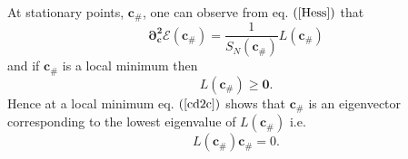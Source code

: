 \documentclass[aps,preprint]{revtex4}%
\begin{document}
At stationary points, $\mathbf{c}_{\#}$, one can observe from eq. $\left(
\ref{Hess}\right)  $ that
\begin{equation}
\mathbf{\partial_{\mathbf{c}}^{2}\mathcal{E}\left(  \mathbf{c}_{\#}\right)
=}\frac{1}{S_{N}\left(  \mathbf{c}_{\#}\right)  }L\left(  \mathbf{c}%
_{\#}\right)
\end{equation}
and if $\mathbf{c}_{\#}$ is a local minimum then
\begin{equation}
L\left(  \mathbf{c}_{\#}\right)  \geq\mathbf{0.}%
\end{equation}
Hence at a local minimum eq. $\left(  \ref{cd2c}\right)  $ shows that
$\mathbf{c}_{\#}$ is an eigenvector corresponding to the lowest eigenvalue of
$L\left(  \mathbf{c}_{\#}\right)  $ i.e.%
\begin{equation}
L\left(  \mathbf{c}_{\#}\right)  \mathbf{c}_{\#}=0. \label{loweig}%
\end{equation}
\end{document}
